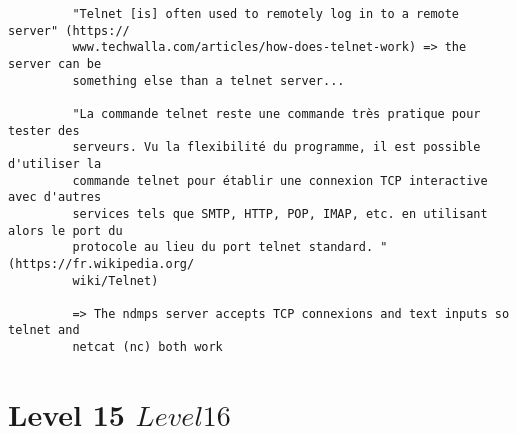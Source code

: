 \documentclass[a4paper]{report}
\begin{document}
\begin{verbatim}
		 "Telnet [is] often used to remotely log in to a remote server" (https://
		 www.techwalla.com/articles/how-does-telnet-work) => the server can be 
		 something else than a telnet server...
		 
		 "La commande telnet reste une commande très pratique pour tester des 
		 serveurs. Vu la flexibilité du programme, il est possible d'utiliser la 
		 commande telnet pour établir une connexion TCP interactive avec d'autres 
		 services tels que SMTP, HTTP, POP, IMAP, etc. en utilisant alors le port du 
		 protocole au lieu du port telnet standard. " (https://fr.wikipedia.org/
		 wiki/Telnet)
		 
		 => The ndmps server accepts TCP connexions and text inputs so telnet and
		 netcat (nc) both work
\end{verbatim}


\section{Level 15 \rightarrow $ Level 16 $}
\end{document}
